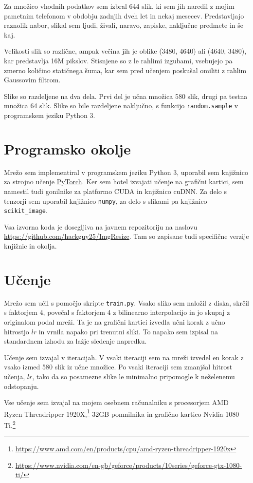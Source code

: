 \documentclass[a4paper,11pt]{article}
\begin{document}
Za množico vhodnih podatkov sem izbral 644 slik, ki sem jih naredil z mojim pametnim telefonom v obdobju zadnjih dveh let in nekaj mesecev.
Predstavljajo raznolik nabor, slikal sem ljudi, živali, naravo, zapiske, naključne predmete in še kaj.

Velikosti slik so različne, ampak večina jih je oblike (3480, 4640) ali (4640, 3480), kar predstavlja 16M pikslov.
Stisnjene so z le rahlimi izgubami, vsebujejo pa zmerno količino statičnega šuma, kar sem pred učenjem poskušal omiliti z rahlim Gaussovim filtrom.

Slike so razdeljene na dva dela.
Prvi del je učna množica 580 slik, drugi pa testna množica 64 slik.
Slike so bile razdeljene naključno, s funkcijo \texttt{random.sample} v programskem jeziku Python 3.

\section{Programsko okolje}

Mrežo sem implementiral v programskem jeziku Python 3, uporabil sem knjižnico za strojno učenje \href{https://pytorch.org/}{PyTorch}.
Ker sem hotel izvajati učenje na grafični kartici, sem namestil tudi gonilnike za platformo CUDA in knjižnico cuDNN.
Za delo s tenzorji sem uporabil knjižnico \texttt{numpy}, za delo s slikami pa knjižnico \texttt{scikit\_image}.

Vsa izvorna koda je dosegljiva na javnem repozitoriju na naslovu \url{https://github.com/hackguy25/ImgResize}.
Tam so zapisane tudi specifične verzije knjižnic in okolja.

\section{Učenje}

Mrežo sem učil s pomočjo skripte \texttt{train.py}.
Vsako sliko sem naložil z diska, skrčil s faktorjem 4, povečal s faktorjem 4 z bilinearno interpolacijo in jo skupaj z originalom podal mreži.
Ta je na grafični kartici izvedla učni korak z učno hitrostjo $lr$ in vrnila napako pri trenutni sliki.
To napako sem izpisal na standardnem izhodu za lažje sledenje napredku.

Učenje sem izvajal v iteracijah.
V vsaki iteraciji sem na mreži izvedel en korak z vsako izmed 580 slik iz učne množice.
Po vsaki iteraciji sem zmanjšal hitrost učenja, $lr$, tako da so posamezne slike le minimalno pripomogle k neželenemu odstopanju.

Vse učenje sem izvajal na mojem osebnem računalniku s procesorjem AMD Ryzen Thread\-rip\-per
	1920X,\footnote{\url{https://www.amd.com/en/products/cpu/amd-ryzen-threadripper-1920x}}
	32GB pomnilnika in grafično kartico Nvidia 1080 Ti.\footnote{\url{https://www.nvidia.com/en-gb/geforce/products/10series/geforce-gtx-1080-ti/}}
\end{document}
